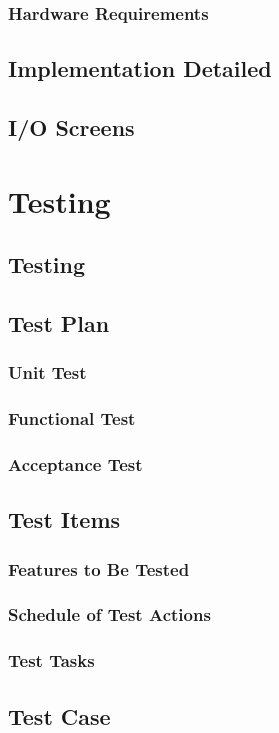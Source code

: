 \documentclass{article}
\begin{document}
			\subsubsection{Hardware Requirements}
		\subsection{Implementation Detailed}
		\subsection{I/O Screens}
		\newpage	
	\section{Testing}
		\subsection{Testing}
		\subsection{Test Plan}
			\subsubsection{Unit Test}
			\subsubsection{Functional Test}
			\subsubsection{Acceptance Test}
		\subsection{Test Items}
			\subsubsection{Features to Be Tested}
			\subsubsection{Schedule of Test Actions}
			\subsubsection{Test Tasks}
		\subsection{Test Case}
\end{document}
